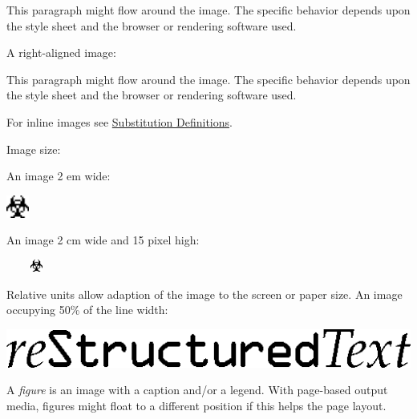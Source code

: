 \documentclass[a4paper]{memoir}
\begin{document}
This paragraph might flow around the image.
The specific behavior depends upon the style sheet and
the browser or rendering software used.

A right-aligned image:


This paragraph might flow around the image.
The specific behavior depends upon the style sheet and
the browser or rendering software used.

For inline images see \hyperref[substitution-definitions]{Substitution Definitions}.

Image size:

An image 2 em wide:

\includegraphics[width=2em]{../../../docs/user/rst/images/biohazard.png}

An image 2 cm wide and 15 pixel high:

\includegraphics[height=15px,width=2cm]{../../../docs/user/rst/images/biohazard.png}

Relative units allow adaption of the image to the screen or paper size.
An image occupying 50\% of the line width:

\includegraphics[width=0.500\linewidth]{../../../docs/user/rst/images/title.png}

A \emph{figure} is an image with a caption and/or a legend.  With page-based output
media, figures might float to a different position if this helps the page
layout.
\end{document}
